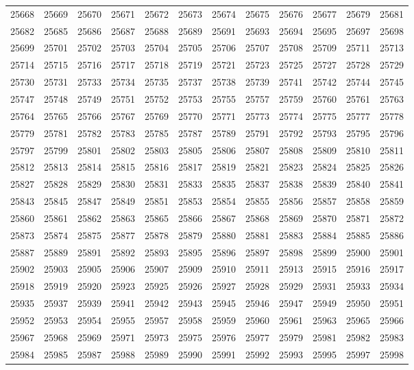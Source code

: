 \begin{center}
\begin{longtable}{llllllllllll}
25668 &25669 &25670 &25671 &25672 &25673 &25674 &25675 &25676 &25677 &25679 &25681 \\
25682 &25685 &25686 &25687 &25688 &25689 &25691 &25693 &25694 &25695 &25697 &25698 \\
25699 &25701 &25702 &25703 &25704 &25705 &25706 &25707 &25708 &25709 &25711 &25713 \\
25714 &25715 &25716 &25717 &25718 &25719 &25721 &25723 &25725 &25727 &25728 &25729 \\
25730 &25731 &25733 &25734 &25735 &25737 &25738 &25739 &25741 &25742 &25744 &25745 \\
25747 &25748 &25749 &25751 &25752 &25753 &25755 &25757 &25759 &25760 &25761 &25763 \\
25764 &25765 &25766 &25767 &25769 &25770 &25771 &25773 &25774 &25775 &25777 &25778 \\
25779 &25781 &25782 &25783 &25785 &25787 &25789 &25791 &25792 &25793 &25795 &25796 \\
25797 &25799 &25801 &25802 &25803 &25805 &25806 &25807 &25808 &25809 &25810 &25811 \\
25812 &25813 &25814 &25815 &25816 &25817 &25819 &25821 &25823 &25824 &25825 &25826 \\
25827 &25828 &25829 &25830 &25831 &25833 &25835 &25837 &25838 &25839 &25840 &25841 \\
25843 &25845 &25847 &25849 &25851 &25853 &25854 &25855 &25856 &25857 &25858 &25859 \\
25860 &25861 &25862 &25863 &25865 &25866 &25867 &25868 &25869 &25870 &25871 &25872 \\
25873 &25874 &25875 &25877 &25878 &25879 &25880 &25881 &25883 &25884 &25885 &25886 \\
25887 &25889 &25891 &25892 &25893 &25895 &25896 &25897 &25898 &25899 &25900 &25901 \\
25902 &25903 &25905 &25906 &25907 &25909 &25910 &25911 &25913 &25915 &25916 &25917 \\
25918 &25919 &25920 &25923 &25925 &25926 &25927 &25928 &25929 &25931 &25933 &25934 \\
25935 &25937 &25939 &25941 &25942 &25943 &25945 &25946 &25947 &25949 &25950 &25951 \\
25952 &25953 &25954 &25955 &25957 &25958 &25959 &25960 &25961 &25963 &25965 &25966 \\
25967 &25968 &25969 &25971 &25973 &25975 &25976 &25977 &25979 &25981 &25982 &25983 \\
25984 &25985 &25987 &25988 &25989 &25990 &25991 &25992 &25993 &25995 &25997 &25998 \\

\end{longtable}
\end{center}
